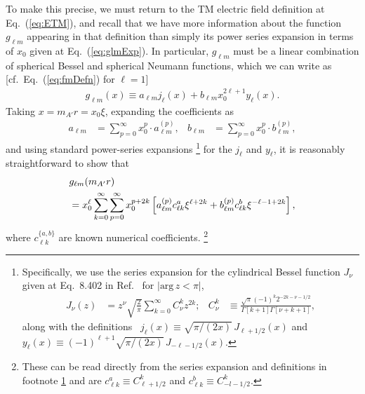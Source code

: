 \documentclass[amsmath,amssymb,aps,10pt,prd,letterpaper,nofootinbib,balancelastpage,notitlepage,superscriptaddress,twocolumn,floatfix]{revtex4-2}
\renewcommand{\eqref}[2][]{Eq{#1}.~(\ref{eq:#2})}	%
\newcommand{\citeR}[2][]{Ref{#1}.~\cite{#2}}		%
\newcommand{\lb}{\ensuremath{\left}}					%
\newcommand{\rb}{\ensuremath{\right}}					%
\begin{document}
To make this precise, we must return to the TM electric field definition at \eqref{ETM}, and recall that we have more information about the function $g_{\ell m}$ appearing in that definition than simply its power series expansion in terms of $x_0$ given at \eqref{glmExp}.
In particular, $g_{\ell m}$ must be a linear combination of spherical Bessel and spherical Neumann functions, which we can write as [cf.~\eqref{fmDefn} for $\ell =1$]
\begin{align}
    g_{\ell m}(x) \equiv a_{\ell m} j_{\ell}(x) + b_{\ell m} x_0^{2\ell+1} y_{\ell}(x).
\end{align}
Taking $x = m_{A'}r = x_0 \xi$, expanding the coefficients as
\begin{align}
    a_{\ell m} &= \sum_{p=0}^{\infty} x_0^p\cdot a_{\ell m}^{(p)}, &
    b_{\ell m} &= \sum_{p=0}^{\infty} x_0^p\cdot b_{\ell m}^{(p)},
\end{align}
and using standard power-series expansions%
\footnote{\label{ftnt:series}%
    Specifically, we use the series expansion for the cylindrical Bessel function $J_\nu$ given at Eq.~8.402 in \citeR{GradshteynRyzhik} for $|\text{arg}\, z<\pi|$, 
    \begin{align*}
        J_\nu(z) &= z^\nu \sqrt{\frac{2}{\pi}}  \sum_{k=0}^\infty C_{\nu}^{k} z^{2k}; & 
        C_{\nu}^{k} &\equiv \frac{\sqrt{\pi}(-1)^k 2^{-2k-\nu-1/2}}{\Gamma[k+1]\Gamma[\nu+k+1]},
    \end{align*}
    along with the definitions~\cite{ArfkenWeber} $j_{\ell}(x) \equiv \sqrt{\pi/(2x)}\, J_{\ell+1/2}(x)$ and $y_{\ell}(x) \equiv (-1)^{\ell+1} \sqrt{\pi/(2x)}\, J_{-\ell-1/2}(x)$.
} %
for the $j_{\ell}$ and $y_{\ell}$, it is reasonably straightforward to show that 
\begin{align}
    &g_{\ell m}(m_{A'}r)\label{eq:glmFull}\\
    &= x_0^{\ell} \sum_{k=0}^{\infty} \sum_{p=0}^{\infty} x_0^{p+2k}
      \lb[
        a_{\ell m}^{(p)} c^{a}_{\ell k} \xi^{\ell+2k} 
        + b_{\ell m}^{(p)} c^{b}_{\ell k}  \xi^{-\ell-1+2k} 
\rb],\nonumber
\end{align}
where $c^{\{a,b\}}_{\ell k}$ are known numerical coefficients.%
\footnote{\label{ftnt:CaCb}%
    These can be read directly from the series expansion and definitions in footnote \ref{ftnt:series} and are $c^{a}_{\ell k} \equiv C_{\ell +1/2}^{k}$ and $c^{b}_{\ell k} \equiv C_{-l-1/2}^{k}$.
} %
\end{document}
